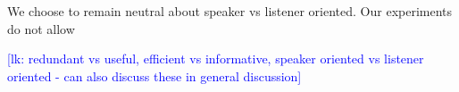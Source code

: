 \documentclass[12pt,letterpaper]{article}
\newcommand{\lk}[1]{\textcolor{Blue}{[lk: #1]}}
\begin{document}
We choose to remain neutral about speaker vs listener oriented. Our experiments do not allow

\lk{redundant vs useful, efficient vs informative, speaker oriented vs listener oriented - can also discuss these in general discussion}
 
\setlength{\bibsep}{0pt plus 0.3ex}
\setlength{\bibhang}{0.3in}			%
\titleformat{\section}{\normalfont\bfseries}{\thesection}{.5em}{}		

		
\newcommand{\doi}[1]{\href{http://dx.doi.org/#1}{http://dx.doi.org/#1}}	%

\end{document}
